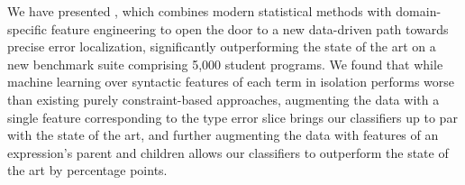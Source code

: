 \label{sec:nate:conclusion}

We have presented \toolname, which
combines modern statistical methods
with domain-specific feature engineering
to open the door to a new data-driven
path towards precise error localization,
significantly outperforming the
state of the art on a new benchmark
suite comprising 5,000 student programs.
%
%
We found that while machine learning
over syntactic features of each term in isolation
performs worse than existing
purely constraint-based approaches, %
augmenting the data with a single feature corresponding to
the type error slice brings our
classifiers up to par with the state of the art,
and further augmenting the data with
features of an expression's parent and children
allows our classifiers to outperform
the state of the art by \ToolnameWinSherrloc
percentage points.



